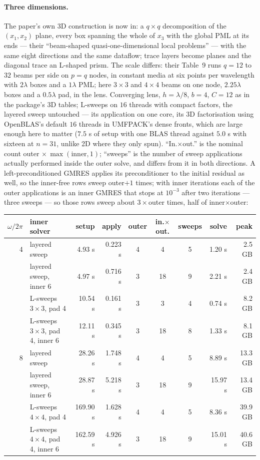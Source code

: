 \documentclass[11pt]{article}
\begin{document}
\paragraph{Three dimensions.} The paper's own 3D construction is now in: a $q\times q$
decomposition of the $(x_1,x_2)$ plane, every box spanning the whole of $x_3$ with the
global PML at its ends --- their ``beam-shaped quasi-one-dimensional local problems'' ---
with the same eight directions and the same dataflow; trace layers become planes and the
diagonal trace an L-shaped prism. The scale differs: their Table~9 runs $q=12$ to $32$
beams per side on $p=q$ nodes, in constant media at six points per wavelength with
$2\lambda$ boxes and a $1\lambda$ PML; here $3\times3$ and $4\times4$ beams on one node,
$2.25\lambda$ boxes and a $0.5\lambda$ pad, in the lens. Converging lens, $h=\lambda/8$,
$b=4$, $C=12$ as in the package's 3D tables; L-sweeps on $16$ threads with compact
factors, the layered sweep untouched --- its application on one core, its 3D
factorisation using OpenBLAS's default $16$ threads in UMFPACK's dense fronts, which are
large enough here to matter ($7.5$ s of setup with one BLAS thread against $5.0$ s with
sixteen at $n=31$, unlike 2D where they only spun). ``In.$\times$out.'' is the nominal
count outer$\,\times\max(\mathrm{inner},1)$; ``sweeps'' is the number of sweep applications
actually performed inside the outer solve, and differs from it in both directions. A
left-preconditioned GMRES applies its preconditioner to the initial residual as well, so
the inner-free rows sweep outer$+1$ times; with inner iterations each of the outer
applications is an inner GMRES that stops at $10^{-3}$ after two iterations --- three
sweeps --- so those rows sweep about $3\times$outer times, half of inner$\times$outer:
\begin{center}\footnotesize\setlength{\tabcolsep}{4pt}
\begin{tabular}{rlrrcccrr}
\toprule
$\omega/2\pi$ & inner solver & setup & apply & outer & in.$\times$out. & sweeps & solve & peak \\
\midrule
4 & layered sweep                & 4.93 s   & 0.223 s & 4 & 4  & 5 & 1.20 s  & 2.5 GB \\
  & layered sweep, inner 6       & 4.97 s   & 0.716 s & 3 & 18 & 9 & 2.21 s  & 2.4 GB \\
  & L-sweeps $3\times3$, pad 4          & 10.54 s  & 0.161 s & 3 & 3  & 4 & 0.74 s  & 8.2 GB \\
  & L-sweeps $3\times3$, pad 4, inner 6 & 12.11 s  & 0.345 s & 3 & 18 & 8 & 1.33 s  & 8.1 GB \\
8 & layered sweep                & 28.26 s  & 1.748 s & 4 & 4  & 5 & 8.89 s  & 13.3 GB \\
  & layered sweep, inner 6       & 28.87 s  & 5.218 s & 3 & 18 & 9 & 15.97 s & 13.4 GB \\
  & L-sweeps $4\times4$, pad 4          & 169.90 s & 1.628 s & 4 & 4  & 5 & 8.36 s  & 39.9 GB \\
  & L-sweeps $4\times4$, pad 4, inner 6 & 162.59 s & 4.926 s & 3 & 18 & 9 & 15.01 s & 40.6 GB \\
\bottomrule
\end{tabular}
\end{center}
\end{document}
